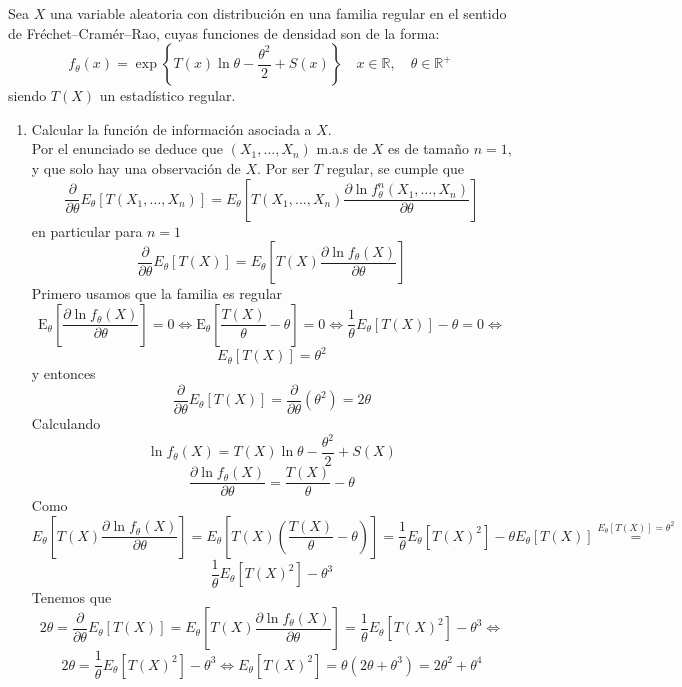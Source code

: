 \documentclass[12pt]{article}
\newcommand{\E}{\mathrm{E}}
\newcommand{\R}{\mathbb{R}}
\newcommand{\Rmas}{\R^{+}}
\begin{document}
    \begin{ejercicio}[2 puntos]
        Sea $X$ una variable aleatoria con distribución en una familia regular en el sentido
        de Fréchet--Cramér--Rao, cuyas funciones de densidad son de la forma:
        $$f_\theta(x)=\exp \left\{T(x)\ln\theta-\dfrac{\theta^2}{2}+S(x)\right\} \quad x\in\R, \quad \theta\in\Rmas$$
        siendo $T(X)$ un estadístico regular.

        \begin{enumerate}
            \item[a)] Calcular la función de información asociada a $X$. \\
            
            Por el enunciado se deduce que $(X_1, \ldots, X_n)$ m.a.s de $X$ es de tamaño $n=1$, y que solo hay una observación de $X$.
            Por ser $T$ regular, se cumple que
            $$\dfrac{\partial}{\partial \theta} E_\theta[T(X_1, \ldots, X_n)] = E_\theta \left[T(X_1, \ldots, X_n) \dfrac{\partial \ln f_\theta^n (X_1, \ldots, X_n)}
            {\partial \theta} \right]$$
            en particular para $n=1$
            $$\dfrac{\partial}{\partial \theta} E_\theta[T(X)] = E_\theta \left[T(X) \dfrac{\partial \ln f_\theta (X)}
            {\partial \theta} \right]$$
            Primero usamos que la familia es regular
            $$\E_\theta \left[ \dfrac{\partial \ln f_\theta(X)}{\partial \theta} \right] = 0 \iff 
            \E_\theta \left[ \dfrac{T(X)}{\theta} - \theta \right] = 0 \iff
            \dfrac{1}{\theta} E_\theta[T(X)] - \theta = 0 \iff$$
            $$E_\theta[T(X)] = \theta^2$$
            y entonces
            $$\dfrac{\partial}{\partial \theta} E_\theta[T(X)] = \dfrac{\partial}{\partial \theta} (\theta^2) = 2 \theta$$
            Calculando
            $$\ln f_\theta(X) = T(X)\ln\theta-\dfrac{\theta^2}{2}+S(X)$$
            $$\dfrac{\partial \ln f_\theta(X)}{\partial \theta} = \dfrac{T(X)}{\theta} - \theta$$
            Como $$E_\theta \left[T(X) \dfrac{\partial \ln f_\theta (X)}
            {\partial \theta} \right] = E_\theta \left[T(X) \left( \dfrac{T(X)}{\theta} - \theta \right)  \right] = 
            \dfrac{1}{\theta} E_\theta[T(X)^2] - \theta E_\theta[T(X)] \stackrel{E_\theta[T(X)] = \theta^2}{=} $$
            $$\dfrac{1}{\theta} E_\theta[T(X)^2] - \theta^3$$
            Tenemos que 
            $$2 \theta = \dfrac{\partial}{\partial \theta} E_\theta[T(X)] = E_\theta \left[T(X) \dfrac{\partial \ln f_\theta (X)}
            {\partial \theta} \right] = \dfrac{1}{\theta} E_\theta[T(X)^2] - \theta^3 \iff$$
            $$2 \theta = \dfrac{1}{\theta} E_\theta[T(X)^2] - \theta^3 \iff E_\theta[T(X)^2] = \theta(2 \theta + \theta^3) = 2 \theta^2 + \theta^4$$


\end{enumerate}
\end{ejercicio}
\end{document}
